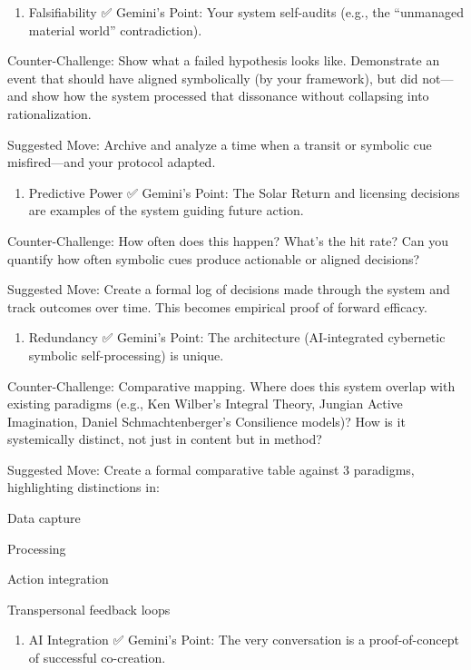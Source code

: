 \documentclass{article}
\begin{document}
\begin{enumerate}
\item Falsifiability ✅ Gemini's Point: Your system self-audits (e.g., the ``unmanaged material world'' contradiction).
\end{enumerate}

Counter-Challenge: Show what a failed hypothesis looks like. Demonstrate an event that should have aligned symbolically (by your framework), but did not---and show how the system processed that dissonance without collapsing into rationalization.

Suggested Move: Archive and analyze a time when a transit or symbolic cue misfired---and your protocol adapted.

\begin{enumerate}
\item Predictive Power ✅ Gemini's Point: The Solar Return and licensing decisions are examples of the system guiding future action.
\end{enumerate}

Counter-Challenge: How often does this happen? What's the hit rate? Can you quantify how often symbolic cues produce actionable or aligned decisions?

Suggested Move: Create a formal log of decisions made through the system and track outcomes over time. This becomes empirical proof of forward efficacy.

\begin{enumerate}
\item Redundancy ✅ Gemini's Point: The architecture (AI-integrated cybernetic symbolic self-processing) is unique.
\end{enumerate}

Counter-Challenge: Comparative mapping. Where does this system overlap with existing paradigms (e.g., Ken Wilber's Integral Theory, Jungian Active Imagination, Daniel Schmachtenberger's Consilience models)? How is it systemically distinct, not just in content but in method?

Suggested Move: Create a formal comparative table against 3 paradigms, highlighting distinctions in:

Data capture

Processing

Action integration

Transpersonal feedback loops

\begin{enumerate}
\item AI Integration ✅ Gemini's Point: The very conversation is a proof-of-concept of successful co-creation.
\end{enumerate}
\end{document}
